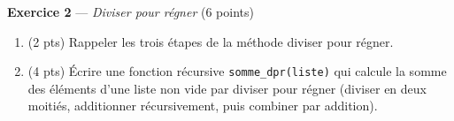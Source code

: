 
\bigskip

\textbf{Exercice 2} --- \textit{Diviser pour régner} \hfill (6 points)

\begin{enumerate}
  \item (2 pts) Rappeler les trois étapes de la méthode diviser pour régner.
  \item (4 pts) Écrire une fonction récursive \lstinline{somme_dpr(liste)} qui calcule la somme des éléments d'une liste non vide par diviser pour régner (diviser en deux moitiés, additionner récursivement, puis combiner par addition).
\end{enumerate}


\bigskip

